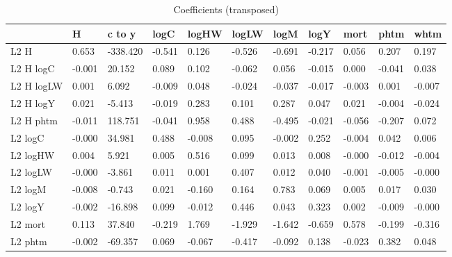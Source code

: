 \begin{table}[htbp]
\caption{\label{clabel} Coefficients (transposed)}\centering\medskip
\begin{tabular}{lllllllllll} \hline \hline
 & H  & c to y  & logC  & logHW  & logLW  & logM  & logY  & mort  & phtm  & whtm  \\  \hline 
L2 H &     0.653 &  -338.420 &    -0.541 &     0.126 &    -0.526 &    -0.691 &    -0.217 &     0.056 &     0.207 &     0.197 \\  
L2 H logC &    -0.001 &    20.152 &     0.089 &     0.102 &    -0.062 &     0.056 &    -0.015 &     0.000 &    -0.041 &     0.038 \\  
L2 H logLW &     0.001 &     6.092 &    -0.009 &     0.048 &    -0.024 &    -0.037 &    -0.017 &    -0.003 &     0.001 &    -0.007 \\  
L2 H logY &     0.021 &    -5.413 &    -0.019 &     0.283 &     0.101 &     0.287 &     0.047 &     0.021 &    -0.004 &    -0.024 \\  
L2 H phtm &    -0.011 &   118.751 &    -0.041 &     0.958 &     0.488 &    -0.495 &    -0.021 &    -0.056 &    -0.207 &     0.072 \\  
L2 logC &    -0.000 &    34.981 &     0.488 &    -0.008 &     0.095 &    -0.002 &     0.252 &    -0.004 &     0.042 &     0.006 \\  
L2 logHW &     0.004 &     5.921 &     0.005 &     0.516 &     0.099 &     0.013 &     0.008 &    -0.000 &    -0.012 &    -0.004 \\  
L2 logLW &    -0.000 &    -3.861 &     0.011 &     0.001 &     0.407 &     0.012 &     0.040 &    -0.001 &    -0.005 &    -0.000 \\  
L2 logM &    -0.008 &    -0.743 &     0.021 &    -0.160 &     0.164 &     0.783 &     0.069 &     0.005 &     0.017 &     0.030 \\  
L2 logY &    -0.002 &   -16.898 &     0.099 &    -0.012 &     0.446 &     0.043 &     0.323 &     0.002 &    -0.009 &    -0.000 \\  
L2 mort &     0.113 &    37.840 &    -0.219 &     1.769 &    -1.929 &    -1.642 &    -0.659 &     0.578 &    -0.199 &    -0.316 \\  
L2 phtm &    -0.002 &   -69.357 &     0.069 &    -0.067 &    -0.417 &    -0.092 &     0.138 &    -0.023 &     0.382 &     0.048 \\  

\end{tabular}
\end{table}
